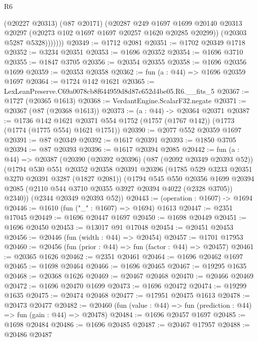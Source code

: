 \begin{lexlean}{R6}
\begin{coremodule}
                (@20227 @20313)
                (@87 @20171)
                (@20287
                  @249
                  @1697
                  @1699
                  @20140
                  @20313
                  @20297
                  (@20273 @102 @1697 @1697 @20257 @1620 @20285 @20299))
                (@20303 @5287 @5328)))))))
@20349 := @1712 @2081
@20351 := @1702 @20349 @1718
@20352 := @3234 @20351
@20353 := @1696 @20352
@20354 := @1696 @3710
@20355 := @1847 @3705
@20356 := @20354 @20355
@20358 := @1696 @20356 @1699
@20359 := @20353 @20358
@20362 := fun (a : @44) => @1696 @20359 @1697
@20364 := @1724 @142 @1621
@20365 := LexLeanPreserve.C69a0078cb8f644959d8d87c652d4be05.R6.__fits_5
@20367 := @1727 (@20365 @1613)
@20368 := VerdantEngine.ScalarF32.negate
@20371 := @20367 (@87 (@20368 @1613))
@20373 := (a : @44) -> @20364 @20371
@20387 := @1736
    @142
    @1621
    @20371
    @554
    @1752
    (@1757 (@1767 @142))
    (@1773 (@1774 (@1775 @554) @1621 @1751))
@20390 := @2077 @552 @20359 @1697
@20391 := @87 @20349
@20392 := @1617 @20391
@20393 := @1850 @3705
@20394 := @87 @20393
@20396 := @1617 @20394 @2085
@20442 := fun (a : @44) =>
  @20387
    (@20390
      (@20392 @20396)
      (@87 (@2092 @20349 @20393 @52))
      (@1794
        @530
        @551
        @20352
        @20358
        @20391
        @20396
        (@1785 @529 @3233 @20351 @3270 @20391 @3287 (@1827 @2081))
        (@1794
          @545
          @550
          @20356
          @1699
          @20394
          @2085
          (@2110 @544 @3710 @20355 @3927 @20394 @4022 (@2328 @3705))
          @2340))
      (@2344 @20349 @20393 @52))
@20443 := (operation : @1607) -> @1694
@20446 := @1610 (fun ("_" : @1607) => @1694) @1613
@20447 := @2351 @17045
@20449 := @1696 @20447 @1697
@20450 := @1698 @20449
@20451 := @1696 @20450
@20453 := @13017 @91 @17048
@20454 := @20451 @20453
@20456 := @20446 (fun (width : @44) => @20454)
@20457 := @1701 @17953
@20460 := @20456 (fun (prior : @44) => fun (factor : @44) => @20457)
@20461 := @20365 @1626
@20462 := @2351 @20461
@20464 := @1696 @20462 @1697
@20465 := @1698 @20464
@20466 := @1696 @20465
@20467 := @19295 @1635
@20468 := @20368 @1626
@20469 := @20467 @20468
@20470 := @20466 @20469
@20472 := @1696 @20470 @1699
@20473 := @1696 @20472
@20474 := @19299 @1635
@20475 := @20474 @20468
@20477 := @17951 @20475 @1613
@20478 := @20473 @20477
@20482 := @20460 (fun (value : @44) => fun (prediction : @44) => fun (gain : @44) => @20478)
@20484 := @1696 @20457 @1697
@20485 := @1698 @20484
@20486 := @1696 @20485
@20487 := @20467 @17957
@20488 := @20486 @20487

\end{coremodule}
\end{lexlean}
